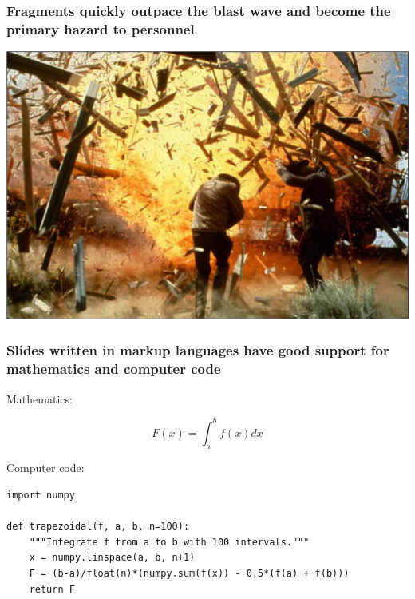 \documentclass{beamer}
\begin{document}
\begin{frame}
\frametitle{Fragments quickly outpace the blast wave and become the primary hazard to personnel}

\centerline{\includegraphics[width=0.9\linewidth]{fig-talk/blast.png}}



\end{frame}

\begin{frame}
\frametitle{Slides written in markup languages have good support for mathematics and computer code}


\begin{block}{Mathematics: }

\[ F(x) = \int_a^b f(x)dx\]
\end{block}

\begin{block}{Computer code: }
\begin{verbatim}
import numpy

def trapezoidal(f, a, b, n=100):
    """Integrate f from a to b with 100 intervals."""
    x = numpy.linspace(a, b, n+1)
    F = (b-a)/float(n)*(numpy.sum(f(x)) - 0.5*(f(a) + f(b)))
    return F
\end{verbatim}
\end{block}
\end{frame}
\end{document}
